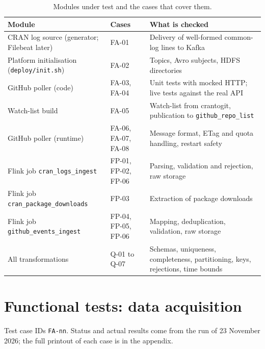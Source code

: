 \documentclass[11pt,a4paper]{article}
\begin{document}
\begin{table}[H]
\centering
\caption{Modules under test and the cases that cover them.}
\small
\begin{tabularx}{\textwidth}{@{}L{4.6cm}L{2.6cm}Y@{}}
\toprule
\textbf{Module} & \textbf{Cases} & \textbf{What is checked} \\
\midrule
CRAN log source (generator; Filebeat later) & FA-01 & Delivery of well-formed common-log lines to Kafka \\
Platform initialisation (\texttt{deploy/init.sh}) & FA-02 & Topics, Avro subjects, HDFS directories \\
GitHub poller (code) & FA-03, FA-04 & Unit tests with mocked HTTP; live tests against the real API \\
Watch-list build & FA-05 & Watch-list from crantogit, publication to \texttt{github\_repo\_list} \\
GitHub poller (runtime) & FA-06, FA-07, FA-08 & Message format, ETag and quota handling, restart safety \\
Flink job \texttt{cran\_logs\_ingest} & FP-01, FP-02, FP-06 & Parsing, validation and rejection, raw storage \\
Flink job \texttt{cran\_package\_downloads} & FP-03 & Extraction of package downloads \\
Flink job \texttt{github\_events\_ingest} & FP-04, FP-05, FP-06 & Mapping, deduplication, validation, raw storage \\
All transformations & Q-01 to Q-07 & Schemas, uniqueness, completeness, partitioning, keys, rejections, time bounds \\
\bottomrule
\end{tabularx}
\end{table}

\pdfpagewidth=29.7cm \pdfpageheight=21cm
\section{Functional tests: data acquisition}
Test case IDs \texttt{FA-nn}. Status and actual results come from the run of 23 November 2026; the full printout of each case is in the appendix.
\end{document}
